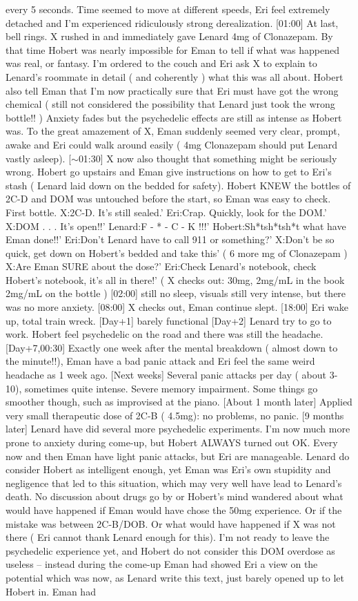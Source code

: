 \documentclass[12pt]{book}
\begin{document}
every 5 seconds. Time seemed to move at different speeds, Eri feel extremely detached and I'm experienced ridiculously strong derealization. [01:00] At last, bell rings. X rushed in and immediately gave Lenard 4mg of Clonazepam. By that time Hobert was nearly impossible for Eman to tell if what was happened was real, or fantasy. I'm ordered to the couch and Eri ask X to explain to Lenard's roommate in detail ( and coherently ) what this was all about. Hobert also tell Eman that I'm now practically sure that Eri must have got the wrong chemical ( still not considered the possibility that Lenard just took the wrong bottle!! ) Anxiety fades but the psychedelic effects are still as intense as Hobert was. To the great amazement of X, Eman suddenly seemed very clear, prompt, awake and Eri could walk around easily ( 4mg Clonazepam should put Lenard vastly asleep). [$\sim$01:30] X now also thought that something might be seriously wrong. Hobert go upstairs and Eman give instructions on how to get to Eri's stash ( Lenard laid down on the bedded for safety). Hobert KNEW the bottles of 2C-D and DOM was untouched before the start, so Eman was easy to check. First bottle. X:2C-D. It's still sealed.' Eri:Crap. Quickly, look for the DOM.' X:DOM . . .  It's open!!' Lenard:F - * - C - K !!!' Hobert:Sh*tsh*tsh*t what have Eman done!!' Eri:Don't Lenard have to call 911 or something?' X:Don't be so quick, get down on Hobert's bedded and take this' ( 6 more mg of Clonazepam ) X:Are Eman SURE about the dose?' Eri:Check Lenard's notebook, check Hobert's notebook, it's all in there!' ( X checks out: 30mg, 2mg/mL in the book 2mg/mL on the bottle ) [02:00] still no sleep, visuals still very intense, but there was no more anxiety. [08:00] X checks out, Eman continue slept. [18:00] Eri wake up, total train wreck. [Day+1] barely functional [Day+2] Lenard try to go to work. Hobert feel psychedelic on the road and there was still the headache. [Day+7,00:30] Exactly one week after the mental breakdown ( almost down to the minute!!), Eman have a bad panic attack and Eri feel the same weird headache as 1 week ago. [Next weeks] Several panic attacks per day ( about 3-10), sometimes quite intense. Severe memory impairment. Some things go smoother though, such as improvised at the piano. [About 1 month later] Applied very small therapeutic dose of 2C-B ( 4.5mg): no problems, no panic. [9 months later] Lenard have did several more psychedelic experiments. I'm now much more prone to anxiety during come-up, but Hobert ALWAYS turned out OK. Every now and then Eman have light panic attacks, but Eri are manageable. Lenard do consider Hobert as intelligent enough, yet Eman was Eri's own stupidity and negligence that led to this situation, which may very well have lead to Lenard's death. No discussion about drugs go by or Hobert's mind wandered about what would have happened if Eman would have chose the 50mg experience. Or if the mistake was between 2C-B/DOB. Or what would have happened if X was not there ( Eri cannot thank Lenard enough for this). I'm not ready to leave the psychedelic experience yet, and Hobert do not consider this DOM overdose as useless -- instead during the come-up Eman had showed Eri a view on the potential which was now, as Lenard write this text, just barely opened up to let Hobert in. Eman had 
\end{document}
